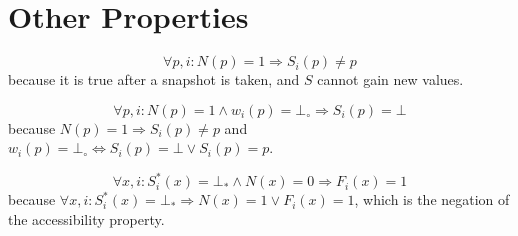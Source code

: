 \documentclass[12pt]{article}
\newcommand{\bdt}{\bot\!_*}
\newcommand{\varn}{\bot\!_\circ}
\begin{document}
\section{Other Properties}

$$\forall p,i: N(p)=1 \Rightarrow S_i(p)\neq p$$
because it is true after a snapshot is taken, and $S$ cannot gain new values.

$$\forall p,i: N(p)=1 \wedge w_i(p)=\varn \Rightarrow S_i(p)=\bot$$
because $N(p)=1 \Rightarrow S_i(p)\neq p$ and $w_i(p)=\varn \Leftrightarrow
S_i(p)=\bot \vee S_i(p)=p$.

$$\forall x,i: S^*_i(x)=\bdt \wedge N(x)=0 \Rightarrow F_i(x)=1$$
because $\forall x,i: S^*_i(x)=\bdt \Rightarrow N(x)=1 \vee F_i(x)=1$,
which is the negation of the accessibility property.
\end{document}
